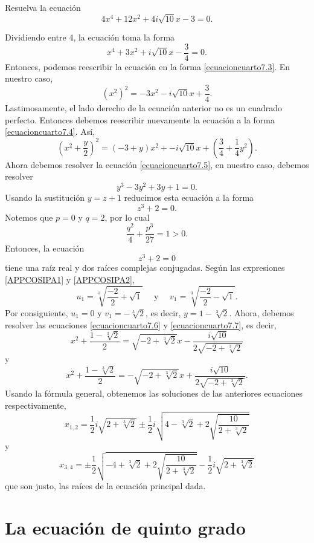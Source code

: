 \begin{examplebox}{}{}
    Resuelva la ecuación
    $$4x^4 + 12x^2 + 4i\sqrt{10}x - 3 = 0.$$

    \tcblower
    \solucion Dividiendo entre 4, la ecuación toma la forma
    $$x^4 + 3x^2 + i\sqrt{10}x - \frac{3}{4} = 0.$$
    Entonces, podemos reescribir la ecuación en la forma \eqref{ecuacioncuarto7.3}. En nuestro caso,
    $$\left( x^2 \right)^2 = - 3x^2 - i\sqrt{10}x + \frac{3}{4}.$$
    Lastimosamente, el lado derecho de la ecuación anterior no es un cuadrado perfecto. Entonces debemos reescribir nuevamente la ecuación a la forma \eqref{ecuacioncuarto7.4}. Así,
    $$\left( x^2 + \frac{y}{2} \right)^2 = \left(-3 + y\right)x^2 + -i\sqrt{10}x + \left( \frac{3}{4} + \frac{1}{4} y^2 \right).$$
    Ahora debemos resolver la ecuación \eqref{ecuacioncuarto7.5}, en nuestro caso, debemos resolver
    $$y^3 - 3y^2 + 3y + 1 = 0.$$
    Usando la sustitución $y = z + 1$ reducimos esta ecuación a la forma
    $$z^3 + 2 = 0.$$
    Notemos que $p = 0$ y $q = 2$, por lo cual
    $$\frac{q^2}{4} + \frac{p^3}{27} = 1 > 0.$$
    Entonces, la ecuación
    $$z^3 + 2 = 0$$
    tiene una raíz real y dos raíces complejas conjugadas. Según las expresiones \eqref{APPCOSIPA1} y \eqref{APPCOSIPA2},
    $$u_1 = \sqrt[3]{\frac{-2}{2} + \sqrt{1}} \quad \text{ y } \quad v_1 = \sqrt[3]{\frac{-2}{2} - \sqrt{1}}.$$
    Por consiguiente, $u_1 = 0$ y $v_1 = -\sqrt[3]{2}$, es decir, $y = 1 -\sqrt[3]{2}$. Ahora, debemos resolver las ecuaciones \eqref{ecuacioncuarto7.6} y \eqref{ecuacioncuarto7.7}, es decir,
    $$x^2 + \frac{1 - \sqrt[3]{2}}{2} = \sqrt{-2 + \sqrt[3]{2}}x - \frac{i\sqrt{10}}{2\sqrt{-2 + \sqrt[3]{2}}}$$
    y
    $$x^2 + \frac{1 - \sqrt[3]{2}}{2} = - \sqrt{-2 + \sqrt[3]{2}}x + \frac{i\sqrt{10}}{2\sqrt{-2 + \sqrt[3]{2}}}.$$
    Usando la fórmula general, obtenemos las soluciones de las anteriores ecuaciones respectivamente,
    $$x_{1, 2} = \frac{1}{2}i \sqrt{2 + \sqrt[3]{2}} \pm \frac{1}{2}i \sqrt{4 - \sqrt[3]{2} + 2\sqrt{\frac{10}{2 + \sqrt[3]{2}}}}$$
    y
    $$x_{3, 4} = \pm \frac{1}{2} \sqrt{- 4 + \sqrt[3]{2} + 2\sqrt{\frac{10}{2 + \sqrt[3]{2}}}} - \frac{1}{2}i\sqrt{2 + \sqrt[3]{2}}$$
    que son justo, las raíces de la ecuación principal dada.
\end{examplebox}

\newpage

\section{La ecuación de quinto grado}\label{ecuacion_quinto_grado}

